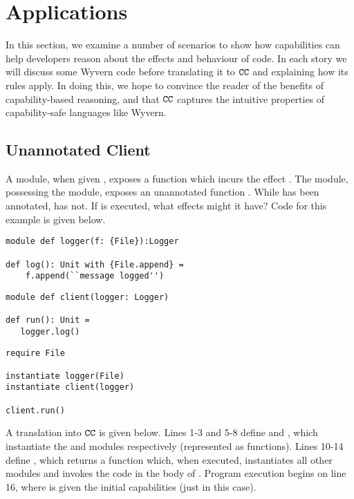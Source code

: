 \vspace{-0.5cm}
\section{Applications}
\vspace{-0.3cm}
\label{s:app}

In this section, we examine a number of scenarios to show how capabilities can help
developers reason about the effects and behaviour of code. In each story we will
discuss some Wyvern code before translating it to $\mathtt{CC}$ and explaining how its
rules apply. In doing this, we hope to convince the reader of the benefits of
capability-based reasoning, and that $\mathtt{CC}$ captures the intuitive properties of
capability-safe languages like Wyvern.

\vspace{-0.5cm}
\subsection{Unannotated Client}
\vspace{-0.2cm}

A  module, when given , exposes a  function
which incurs the effect . The  module, possessing the
 module, exposes an unannotated function . While
 has been annotated,  has not. If  is
executed, what effects might it have? Code for this example is given below. 

\begin{lstlisting}
module def logger(f: {File}):Logger

def log(): Unit with {File.append} =
    f.append(``message logged'')
\end{lstlisting}

\begin{lstlisting}
module def client(logger: Logger)

def run(): Unit =
   logger.log()
\end{lstlisting}

\begin{lstlisting}
require File

instantiate logger(File)
instantiate client(logger)

client.run()
\end{lstlisting}

A translation into $\mathtt{CC}$ is given below. Lines 1-3 and 5-8 define
 and , which instantiate the  and
 modules respectively (represented as functions). Lines 10-14 define
, which returns a function which, when executed, instantiates all
other modules and invokes the code in the body of . Program execution
begins on line 16, where  is given the initial capabilities (just 
in this case).

